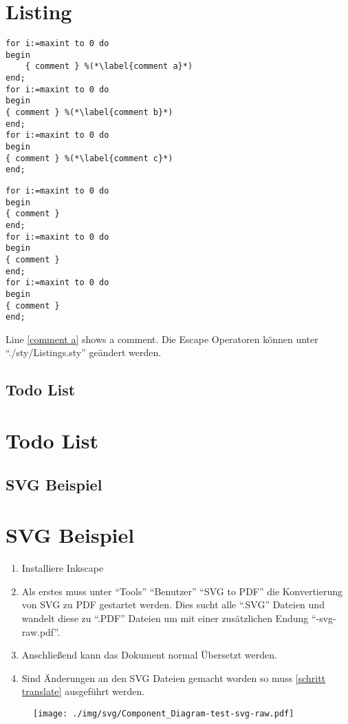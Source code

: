 \documentclass[./\jobname.tex]{subfiles}
\begin{document}
	\chapter{Listing}
\fi
%
\begin{lstlisting}[caption={example}]
for i:=maxint to 0 do
begin
	{ comment } %(*\label{comment a}*)
end;
for i:=maxint to 0 do
begin
{ comment } %(*\label{comment b}*)
end;
for i:=maxint to 0 do
begin
{ comment } %(*\label{comment c}*)
end;
\end{lstlisting}
%
\begin{lstlisting}[caption={example}]
for i:=maxint to 0 do
begin
{ comment } 
end;
for i:=maxint to 0 do
begin
{ comment }
end;
for i:=maxint to 0 do
begin
{ comment }
end;
\end{lstlisting}
%
Line \ref{comment a} shows a comment. Die Escape Operatoren können unter \enquote{./sty/Listings.sty} geändert werden. 
%
\if\paper\FHVmode
	\section{Todo List}
\else
	\chapter{Todo List}
\fi
%
\lipsum[1] 
\lipsum[2] 
\lipsum[3]
%
\if\paper\FHVmode
	\section{SVG Beispiel}
\else
	\chapter{SVG Beispiel}
\fi
%
\begin{enumerate}
	\item Installiere Inkscape
	\item Als erstes muss unter \enquote{Tools} \pfeil \enquote{Benutzer} \pfeil \enquote{SVG to PDF} die Konvertierung von SVG zu PDF gestartet werden. Dies sucht alle \enquote{.SVG} Dateien und wandelt diese zu \enquote{.PDF} Dateien um mit einer zusätzlichen Endung \enquote{-svg-raw.pdf}.\label{schritt translate}
	\item Anschließend kann das Dokument normal Übersetzt werden.
	\item Sind Änderungen an den SVG Dateien gemacht worden so muss \ref{schritt translate} ausgeführt werden.
\end{enumerate}
%
\begin{figure}[H]
	\centering
	\texttt{[image: ./img/svg/Component\_Diagram-test-svg-raw.pdf]}
	\label{fig: beispiel svg}
\end{figure}
%
\if\paper\FHVmode
\end{document}
